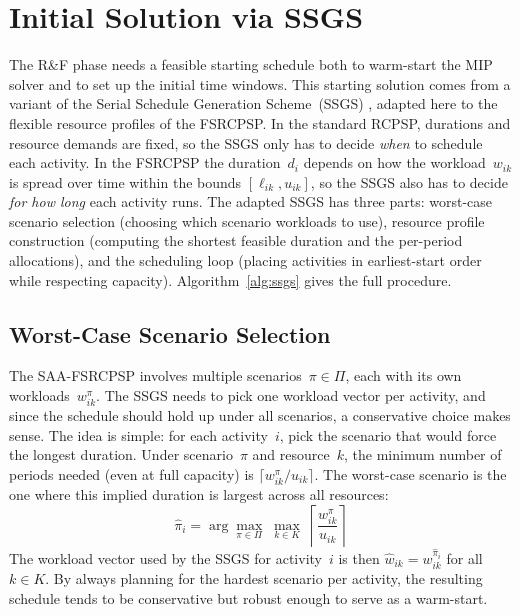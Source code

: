 \section{Initial Solution via SSGS}
\label{sec:ssgs}
The R\&F phase needs a feasible starting schedule both to
warm-start the MIP solver and to set up the initial time windows.
This starting solution comes from a variant of the Serial Schedule
Generation Scheme~(SSGS) \parencite{Kolisch1999}, adapted here to
the flexible resource profiles of the FSRCPSP. In the standard
RCPSP, durations and resource demands are fixed, so the SSGS only
has to decide \textit{when} to schedule each activity. In the
FSRCPSP the duration~$d_i$ depends on how the workload~$w_{ik}$ is
spread over time within the bounds $[\ell_{ik}, u_{ik}]$, so the
SSGS also has to decide \textit{for how long} each activity runs.
The adapted SSGS has three parts: worst-case scenario selection
(choosing which scenario workloads to use), resource profile
construction (computing the shortest feasible duration and the
per-period allocations), and the scheduling loop (placing
activities in earliest-start order while respecting capacity).
Algorithm~\ref{alg:ssgs} gives the full procedure.
\subsection{Worst-Case Scenario Selection}
\label{subsec:worst_case}
The SAA-FSRCPSP involves multiple scenarios~$\pi \in \Pi$, each
with its own workloads~$w_{ik}^{\pi}$. The SSGS needs to pick one
workload vector per activity, and since the schedule should hold up
under all scenarios, a conservative choice makes sense.
The idea is simple: for each activity~$i$, pick the scenario that
would force the longest duration. Under scenario~$\pi$ and
resource~$k$, the minimum number of periods needed (even at full
capacity) is $\lceil w_{ik}^{\pi} / u_{ik} \rceil$. The
worst-case scenario is the one where this implied duration is
largest across all resources:
\begin{equation}
    \hat{\pi}_i = \arg\max_{\pi \in \Pi}\;
    \max_{k \in K}\;
    \left\lceil \frac{w_{ik}^{\pi}}{u_{ik}} \right\rceil
    \label{eq:worst_case}
\end{equation}
The workload vector used by the SSGS for activity~$i$ is then
$\hat{w}_{ik} = w_{ik}^{\hat{\pi}_i}$ for all~$k \in K$. By
always planning for the hardest scenario per activity, the
resulting schedule tends to be conservative but robust enough to
serve as a warm-start.

